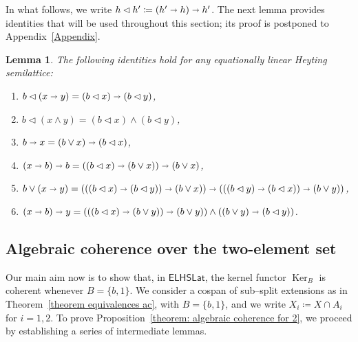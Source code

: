 \documentclass[reqno,a4paper]{amsart}
\newtheorem{lemma}{Lemma}[section]
\theoremstyle{remark}
\theoremstyle{definition}
\newcommand{\omeet}{\cap} %
\newcommand{\iimplies}{\shortrightarrow}
\DeclareMathOperator{\Ker}{Ker}
\newcommand{\ELHSLat}{\ensuremath{\mathsf{ELHSLat}}}
\begin{document}
In what follows, we write \(h \lhd h' \coloneq (h' \iimplies h)\iimplies h'\).
The next lemma provides identities that will be used throughout this section;
its proof is postponed to Appendix~\ref{Appendix}.

\begin{lemma}\label{Equations}
	The following identities hold for any equationally linear Heyting semilattice:
	\begin{enumerate}
		\item \(b\lhd(x\iimplies y) = (b\lhd x) \iimplies (b\lhd y)\),
		\item \(b\lhd(x\wedge y) = (b\lhd x) \wedge (b \lhd y)\),
		\item \(b\iimplies x = (b\vee x) \iimplies (b\lhd x)\),
		\item \((x\iimplies b) \iimplies b = ((b \lhd  x) \iimplies (b \vee x))\iimplies (b \vee x)\),
		\item \(b\vee (x\iimplies y) = (((b\lhd x) \iimplies (b\lhd y)) \iimplies (b \vee x)) \iimplies (((b\lhd y) \iimplies (b\lhd x))\iimplies (b \vee y))\),
		\item \((x\iimplies b) \iimplies y = (((b \lhd  x) \iimplies (b \vee y))\iimplies (b \vee y)) \wedge ((b \vee y) \iimplies (b\lhd y))\).
	\end{enumerate}
\end{lemma}


\subsection*{Algebraic coherence over the two-element set}



Our main aim now is to show that, in \(\ELHSLat\), the kernel functor \(\Ker_B\) is coherent whenever \(B=\{b,1\}\).
We consider a cospan of sub--split extensions as in Theorem~\ref{theorem equivalences ac}, with \(B=\{b,1\}\), and we write
\(X_i \coloneq X \omeet A_i\) for \(i=1,2\).
To prove Proposition~\ref{theorem: algebraic coherence for 2}, we proceed by establishing a series of intermediate lemmas.
\end{document}
